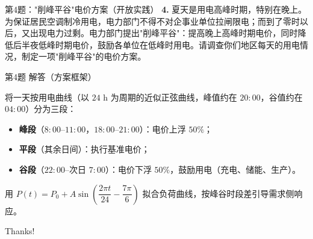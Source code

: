 \documentclass[10pt,aspectratio=169,serif]{beamer}
\begin{document}
\begin{frame}[t]{第4题："削峰平谷"电价方案（开放实践）}
\textbf{4.} 夏天是用电高峰时期，特别在晚上。为保证居民空调制冷用电，电力部门不得不对企事业单位拉闸限电；而到了零时以后，又出现电力过剩。电力部门提出"削峰平谷"：提高晚上高峰时期电价，同时降低后半夜低峰时期电价，鼓励各单位在低峰时用电。请调查你们地区每天的用电情况，制定一项"削峰平谷"的电价方案。
\end{frame}

\begin{frame}[t]{第4题 解答（方案框架）}
\begin{tcolorbox}[colback=orange!10,colframe=orange,title=\textbf{参考方案}]
将一天按用电曲线（以 $24$ h 为周期的近似正弦曲线，峰值约在 $20:00$，谷值约在 $04:00$）分为三段：
\begin{itemize}
  \item \textbf{峰段}（$8{:}00$--$11{:}00$，$18{:}00$--$21{:}00$）：电价上浮 $50\%$；
  \item \textbf{平段}（其余日间）：执行基准电价；
  \item \textbf{谷段}（$22{:}00$--次日 $7{:}00$）：电价下浮 $50\%$，鼓励用电（充电、储能、生产）。
\end{itemize}
用 $P(t)=P_0+A\sin\!\left(\dfrac{2\pi t}{24}-\dfrac{7\pi}{6}\right)$ 拟合负荷曲线，按峰谷时段差引导需求侧响应。
\end{tcolorbox}
\end{frame}

\begin{frame}[c]
  \begin{center}
    {\Huge\calligra Thanks!}
  \end{center}
\end{frame}
\end{document}
